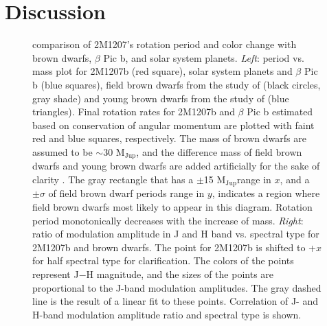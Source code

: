 \documentclass[apj]{emulateapj}
\newcommand{\bpic}{$\beta$ Pic}
\newcommand{\vsini}{$v\sin i$}
\newcommand{\mjup}{M$_{\mbox{Jup}}$}
\begin{document}
\section{Discussion}
\label{sec:discussion}
\begin{figure}
  \centering
  \caption{comparison of 2M1207's rotation period and color change
    with brown dwarfs, \bpic{} b, and solar system planets. {\em
      Left}: period vs. mass plot for 2M1207b (red square), solar
    system planets and \bpic{} b (blue squares), field brown dwarfs
    from the study of \citet[][]{Metchev2015}
    (black circles, gray shade) and young brown dwarfs from the study
    of \citet{Scholz2015} (blue
    triangles). Final rotation rates for 2M1207b and \bpic{} b
    estimated based on conservation of angular momentum are plotted
    with faint red and blue squares, respectively. The mass of brown
    dwarfs are assumed to be $\sim30$ \mjup{}, and the difference mass
    of field brown dwarfs and young brown dwarfs are added
    artificially for the sake of clarity . The gray rectangle that has a
    $\pm$15
    \mjup range in $x$,
    and a $\pm \sigma$
    of field brown dwarf periods range in $y$,
    indicates a region where field brown dwarfs most likely to appear in
    this diagram. Rotation period monotonically decreases with the
    increase of mass. {\em Right}: ratio of modulation amplitude in J
    and H band vs. spectral type for 2M1207b and brown dwarfs. The
    point for 2M1207b is shifted to +$x$
    for half spectral type for clarification.  The colors of the
    points represent J$-$H
    magnitude, and the sizes of the points are proportional to the
    J-band modulation amplitudes. The gray dashed line is the result
    of a linear fit to these points.  Correlation of J- and H-band
    modulation amplitude ratio and spectral type is shown.}
 \label{fig:5}
\end{figure}

\end{document}
